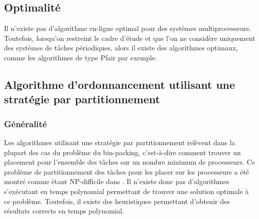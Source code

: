 \subsection{Optimalité}
\vspace{-1cm}
\begin{theoreme}[\cite{HL92}]
Il n'existe pas d'algorithme en-ligne optimal pour des systèmes multiprocesseurs. Toutefois, lorsqu'on restreint le cadre d'étude et que l'on ne considère uniquement des systèmes de tâches périodiques, alors il existe des algorithmes optimaux, comme les algorithmes de type Pfair par exemple.
\end{theoreme}

\subsection{Algorithme d'ordonnancement utilisant une stratégie par partitionnement}
\subsubsection{Généralité}
\vspace{-1cm}
Les algorithmes utilisant une stratégie par partitionnement relèvent dans la plupart des cas du problème du bin-packing, c'est-à-dire comment trouver un placement pour l'ensemble des tâches sur un nombre minimum de processeurs.
Ce problème de partitionnement des tâches pour les placer sur les processeurs a été montré comme étant NP-difficile dans \cite{LW82}. Il n'existe donc pas d'algorithmes s'exécutant en temps polynomial permettant de trouver une solution optimale à ce problème. Toutefois, il existe des heuristiques permettant d'obtenir des résultats corrects en temps polynomial.

